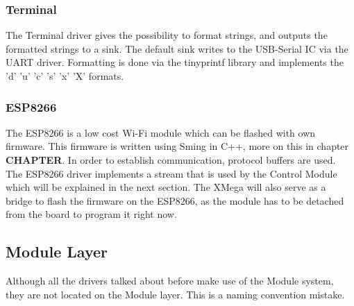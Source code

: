 \subsubsection{Terminal}
The Terminal driver gives the possibility to format strings, and outputs the formatted strings to a sink. The default sink writes to the USB-Serial IC via the UART driver. Formatting is done via the tinyprintf library\cite{sparetimelabs:tinyprintf} and implements the 'd' 'u' 'c' 's' 'x' 'X' formats.
\subsubsection{ESP8266}
The ESP8266 is a low cost Wi-Fi module which can be flashed with own firmware. This firmware is written using Sming in C++, more on this in chapter \textbf{CHAPTER}. In order to establish communication, protocol buffers are used. The ESP8266 driver implements a stream that is used by the Control Module which will be explained in the next section. The XMega will also serve as a bridge to flash the firmware on the ESP8266, as the module has to be detached from the board to program it right now. 
\subsection{Module Layer}
Although all the drivers talked about before make use of the Module system, they are not located on the Module layer. This is a naming convention mistake.
